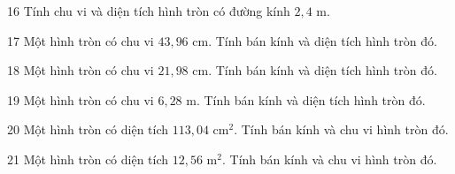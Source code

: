 \gap
\begin{probbox}{16}{\relax}
Tính chu vi và diện tích hình tròn có đường kính $2{,}4$ m.
\end{probbox}
\gap
\begin{probbox}{17}{\relax}
Một hình tròn có chu vi $43{,}96$ cm. Tính bán kính và diện tích hình tròn đó.
\end{probbox}
\gap
\begin{probbox}{18}{\relax}
Một hình tròn có chu vi $21{,}98$ cm. Tính bán kính và diện tích hình tròn đó.
\end{probbox}
\gap
\begin{probbox}{19}{\relax}
Một hình tròn có chu vi $6{,}28$ m. Tính bán kính và diện tích hình tròn đó.
\end{probbox}
\gap
\begin{probbox}{20}{\relax}
Một hình tròn có diện tích $113{,}04$ cm$^2$. Tính bán kính và chu vi hình tròn đó.
\end{probbox}
\gap
\begin{probbox}{21}{\relax}
Một hình tròn có diện tích $12{,}56$ m$^2$. Tính bán kính và chu vi hình tròn đó.
\end{probbox}

